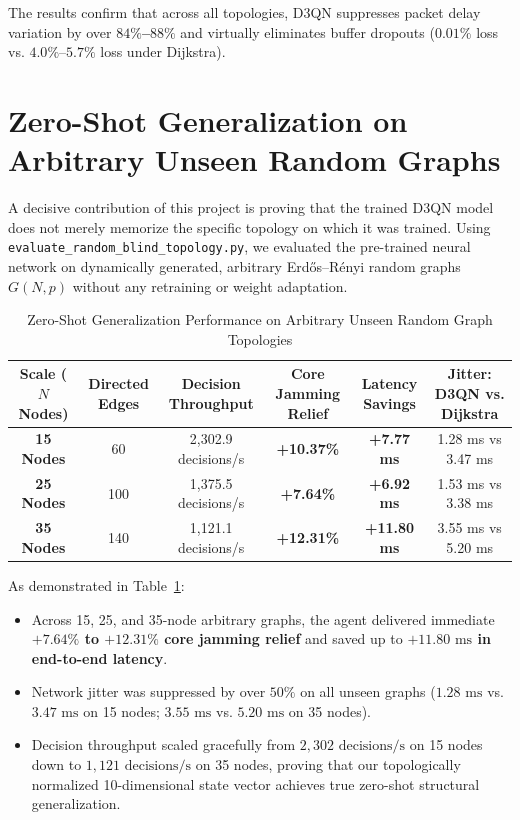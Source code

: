 \documentclass[12pt,a4paper,oneside]{report}
\begin{document}
The results confirm that across all topologies, D3QN suppresses packet delay variation by over \textbf{$84\%$--$88\%$} and virtually eliminates buffer dropouts ($0.01\%$ loss vs. $4.0\%$--$5.7\%$ loss under Dijkstra).

\section{Zero-Shot Generalization on Arbitrary Unseen Random Graphs}
A decisive contribution of this project is proving that the trained D3QN model does not merely memorize the specific topology on which it was trained. Using \texttt{evaluate\_random\_blind\_topology.py}, we evaluated the pre-trained neural network on dynamically generated, arbitrary Erd\H{o}s--R\'enyi random graphs $G(N, p)$ without any retraining or weight adaptation.

\begin{table}[htbp]
\centering
\caption{Zero-Shot Generalization Performance on Arbitrary Unseen Random Graph Topologies}
\label{tab:zero_shot_generalization}
\small
\begin{tabularx}{\textwidth}{c c c c c c}
\toprule
\textbf{Scale ($N$ Nodes)} & \textbf{Directed Edges} & \textbf{Decision Throughput} & \textbf{Core Jamming Relief} & \textbf{Latency Savings} & \textbf{Jitter: D3QN vs. Dijkstra} \\
\midrule
\textbf{15 Nodes} & 60 & 2,302.9 decisions/s & \textbf{+10.37\%} & \textbf{+7.77 ms} & 1.28 ms vs 3.47 ms \\
\addlinespace
\textbf{25 Nodes} & 100 & 1,375.5 decisions/s & \textbf{+7.64\%} & \textbf{+6.92 ms} & 1.53 ms vs 3.38 ms \\
\addlinespace
\textbf{35 Nodes} & 140 & 1,121.1 decisions/s & \textbf{+12.31\%} & \textbf{+11.80 ms} & 3.55 ms vs 5.20 ms \\
\bottomrule
\end{tabularx}
\end{table}

As demonstrated in Table~\ref{tab:zero_shot_generalization}:
\begin{itemize}
    \item Across 15, 25, and 35-node arbitrary graphs, the agent delivered immediate \textbf{$+7.64\%$ to $+12.31\%$ core jamming relief} and saved up to \textbf{$+11.80\text{ ms}$ in end-to-end latency}.
    \item Network jitter was suppressed by over $50\%$ on all unseen graphs ($1.28\text{ ms}$ vs. $3.47\text{ ms}$ on 15 nodes; $3.55\text{ ms}$ vs. $5.20\text{ ms}$ on 35 nodes).
    \item Decision throughput scaled gracefully from $2,302\text{ decisions/s}$ on 15 nodes down to $1,121\text{ decisions/s}$ on 35 nodes, proving that our topologically normalized 10-dimensional state vector achieves true zero-shot structural generalization.
\end{itemize}
\end{document}
